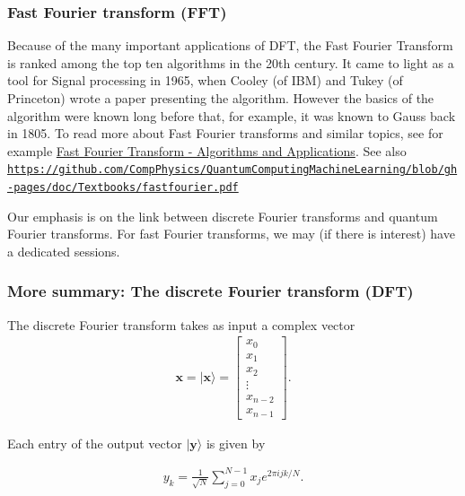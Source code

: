 \documentclass{beamer}
\begin{document}
\begin{frame}
\frametitle{Fast Fourier transform (FFT)}

Because of the many important applications of DFT, the Fast Fourier
Transform is ranked among the top ten  algorithms in the 20th century.
It came to light as a tool for Signal processing in 1965, when
Cooley (of IBM) and Tukey (of Princeton) wrote a paper presenting the
algorithm. However the basics of the algorithm were known long before
that, for example, it was known to Gauss back in 1805.
To read more about Fast Fourier transforms and similar topics, see for example \href{{https://link.springer.com/book/10.1007/978-1-4020-6629-0}}{Fast Fourier Transform - Algorithms and Applications}. See also \href{{https://github.com/CompPhysics/QuantumComputingMachineLearning/blob/gh-pages/doc/Textbooks/fastfourier.pdf}}{\nolinkurl{https://github.com/CompPhysics/QuantumComputingMachineLearning/blob/gh-pages/doc/Textbooks/fastfourier.pdf}}

Our emphasis is on the link between discrete Fourier transforms and quantum Fourier transforms.
For fast Fourier transforms, we may (if there is interest) have a dedicated sessions.
\end{frame}

\begin{frame}
\frametitle{More summary: The discrete Fourier transform (DFT)}

The discrete Fourier transform takes as input a complex vector
\begin{align*}
\bm{x} =\vert\bm{x}\rangle= 
\begin{bmatrix}
x_0 \\ 
x_1 \\ 
x_2 \\
\vdots \\ 
x_{n-2} \\
x_{n-1}
\end{bmatrix}.
\end{align*}

Each entry of the output vector $\vert \bm{y}\rangle$ is given by

\begin{align*}
y_k = \frac{1}{\sqrt{N}} \sum_{j=0}^{N-1} x_je^{2 \pi ijk/N}.
\end{align*}
\end{frame}
\end{document}
